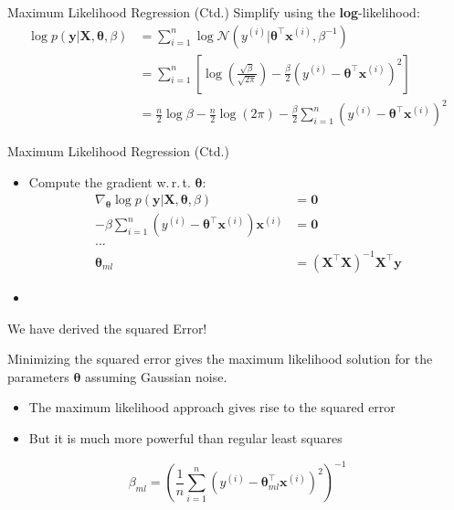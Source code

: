 \begin{frame}{Maximum Likelihood Regression (Ctd.)}{}
	Simplify using the \textbf{log}-likelihood:
	\begin{align}
		\log p(\bm{y} \vert \bm{X}, \bm{\theta}, \beta)
			&= \sum_{i=1}^n \log\mathcal{N}(y^{(i)} \vert \bm{\theta}^{\intercal}\bm{x}^{(i)}, \beta^{-1}) \\
			&= \sum_{i=1}^n \left[ \log\left( \frac{\sqrt{\beta}}{\sqrt{2\pi}} \right) - 
				\frac{\beta}{2}(y^{(i)} - \bm{\theta}^{\intercal}\bm{x}^{(i)})^2 \right] \\
			&= \frac{n}{2} \log\beta - \frac{n}{2}\log(2\pi) - \frac{\beta}{2}\sum_{i=1}^n(y^{(i)} -
				\bm{\theta}^{\intercal}\bm{x}^{(i)})^2
	\end{align}
\end{frame}


\begin{frame}{Maximum Likelihood Regression (Ctd.)}{}
	\begin{itemize}
		\item Compute the gradient w.\,r.\,t. $\bm{\theta}$:
		\begin{align*}
			\nabla_{\bm{\theta}} \log p(\bm{y} \vert \bm{X}, \bm{\theta}, \beta) &= \bm{0} \\
			-\beta \sum_{i=1}^n (y^{(i)} - \bm{\theta}^{\intercal} \bm{x}^{(i)})\bm{x}^{(i)} &= \bm{0} \\
			\dots \\
			\bm{\theta}_{ml} &= (\bm{X}^{\intercal}\bm{X})^{-1} \bm{X}^{\intercal} \bm{y}
		\end{align*}
		\item {}
	\end{itemize}
\end{frame}


\begin{frame}{We have derived the squared Error!}{}\important
	\begin{boxBlueNoFrame}
		Minimizing the squared error gives the maximum likelihood solution for the parameters $\bm{\theta}$ assuming
		Gaussian noise.
	\end{boxBlueNoFrame}
	\begin{itemize}
		\item The maximum likelihood approach gives rise to the squared error
		\item But it is much more powerful than regular least squares
	\end{itemize}
	\begin{equation}
		\beta_{ml} = \left( \frac{1}{n} \sum_{i=1}^n
			(y^{(i)} - \bm{\theta}_{ml}^{\intercal} \bm{x}^{(i)})^2 \right)^{-1}
	\end{equation}
\end{frame}


